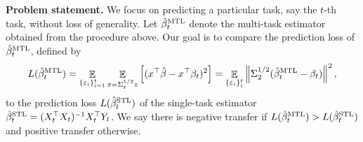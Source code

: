 





\textbf{Problem statement.}
We focus on predicting a particular task, say the $t$-th task, without loss of generality.
Let $\hat{\beta}_t^{\text{MTL}}$ denote the multi-task estimator obtained from the procedure above.
Our goal is to compare the prediction loss of $\hat{\beta}_t^{\text{MTL}}$, defined by
{\small\begin{align*}
		L(\hat{\beta}_t^{\text{MTL}}) = \mathop{\mathbb{E}}_{\{\varepsilon_i\}_{i=1}^t} \mathop{\mathbb{E}}_{x = \Sigma_t^{1/2} z}\left[ ({x}^{\top}\hat{\beta} - {x}^{\top}\beta_t)^2 \right]
		= \mathop{\mathbb{E}}_{\{\varepsilon_i\}_i^t} \left\| \Sigma_2^{1/2} (\hat{\beta}_t^{\text{MTL}} - \beta_t) \right\|^2,
	\end{align*}}%
to the prediction loss $L(\hat{\beta}_t^{\text{STL}})$ of the single-task estimator $\hat{\beta}_t^{\text{STL}} = (X_t^{\top}X_t)^{-1}X_t^{\top}{Y_t}$.
We say there is negative transfer if  $L(\hat{\beta}_t^{\text{MTL}}) > L(\hat{\beta}_t^{\text{STL}})$ and positive transfer otherwise.

